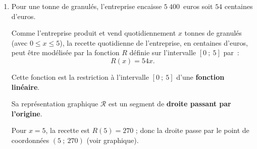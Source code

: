 \begin{center}
\end{center}
\begin{corrige}
     \par
     \begin{enumerate}
          \item Pour une tonne de granulés, l'entreprise encaisse $5\ 400$~euros soit {$54$ centaines} d'euros.
          \par
          Comme l'entreprise produit et vend quotidiennement $x$ tonnes de granulés (avec $0 \leqslant x \leqslant 5$), la recette quotidienne de l'entreprise, en centaines d'euros, peut être modélisée par la fonction $R$ définie sur l'intervalle $[0~;~5]$ par~:
          \[ R(x)= 54x.\]
          \par
          Cette fonction est la restriction à l'intervalle $[0~;~5]$ d'une \textbf{fonction linéaire}.
          \par
          \par
          Sa représentation graphique $\mathscr{R}$ est un segment de \textbf{droite passant par l'origine}.
          \par
          Pour $x=5$, la recette est $R(5)=270$ ; donc la droite passe par le point de coordonnées $(5~;~270)$ (voir graphique).
          \begin{center}
               \begin{extern}%

\end{extern}
\end{center}
\end{enumerate}
\end{corrige}
